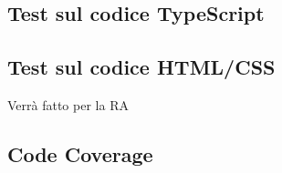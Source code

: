 \subsection{Test sul codice TypeScript}
\subsection{Test sul codice HTML/CSS}
Verrà fatto per la RA
\subsection{Code Coverage}
